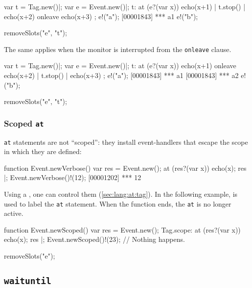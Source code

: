 \begin{urbiscript}
var t = Tag.new()|;
var e = Event.new()|;
t: at (e?(var x))
{
  echo(x+1) | t.stop() | echo(x+2)
}
onleave
{
  echo(x+3)
};
e!("a");
[00001843] *** a1
e!("b");
\end{urbiscript}
\begin{urbicomment}
removeSlots("e", "t");
\end{urbicomment}

The same applies when the monitor is interrupted from the
\lstinline{onleave} clause.
\begin{urbiscript}
var t = Tag.new()|;
var e = Event.new()|;
t: at (e?(var x))
{
  echo(x+1)
}
onleave
{
  echo(x+2) | t.stop() | echo(x+3)
};
e!("a");
[00001843] *** a1
[00001843] *** a2
e!("b");
\end{urbiscript}
\begin{urbicomment}
removeSlots("e", "t");
\end{urbicomment}


\subsubsection{Scoped \lstinline{at}}

\lstinline{at} statements are not ``scoped'': they install event-handlers
that escape the scope in which they are defined:

\begin{urbiscript}
function Event.newVerbose()
{
  var res = Event.new();
  at (res?(var x))
    echo(x);
  res
}|;
Event.newVerbose()!(12);
[00001202] *** 12
\end{urbiscript}

Using a , one can control them (\autoref{sec:lang:at:tag}).
In the following example,  is used to label the
\lstinline{at} statement.  When the function ends, the \lstinline{at} is no
longer active.

\begin{urbiscript}
function Event.newScoped()
{
  var res = Event.new();
  Tag.scope:
    at (res?(var x))
      echo(x);
  res
}|;
Event.newScoped()!(23);
// Nothing happens.
\end{urbiscript}
\begin{urbicomment}
removeSlots("e");
\end{urbicomment}

\subsection{\lstinline{waituntil}}
\label{sec:lang:waituntil}


